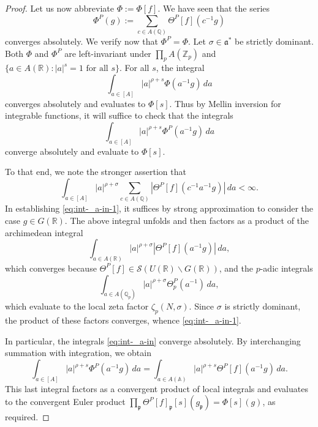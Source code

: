 \begin{proof}
  Let us now abbreviate $\Phi := \Phi[f]$.  We have seen that the series
  \begin{equation*}
    \Phi^P(g) := \sum_{c \in A(\mathbb{Q})} \Theta^P[f](c^{-1} g)
  \end{equation*}
  converges absolutely.  We verify now that $\Phi^P = \Phi$.  Let $\sigma \in \mathfrak{a}^*$ be strictly dominant.  Both $\Phi$ and $\Phi^P$ are left-invariant under $\prod_p A(\mathbb{Z}_p)$ and $\{a \in A(\mathbb{R}) : |a|^s = 1 \text{ for all } s \}$.  For all $s$, the integral
  \begin{equation*}
    \int_{a \in [A]} |a|^{\rho + s} \Phi(a^{-1} g) \, d a
  \end{equation*}
  converges absolutely and evaluates to $\Phi[s]$.  Thus by Mellin inversion for integrable functions, it will suffice to check that the integrals
  \begin{equation}\label{eq:int-_a-in}
    \int_{a \in [A]} |a|^{\rho + s} \Phi^P (a^{-1} g) \, d a
  \end{equation}
  converge absolutely and evaluate to $\Phi[s]$.

  To that end, we note the stronger assertion that
  \begin{equation}\label{eq:int-_a-in-1}
    \int_{a \in [A]} |a|^{\rho + \sigma} \sum_{c \in A(\mathbb{Q})}
    \left\lvert
      \Theta^P[f](c^{-1} a^{-1} g)
    \right\rvert
    \, d a < \infty.
  \end{equation}
  In establishing \eqref{eq:int-_a-in-1}, it suffices by strong approximation to consider the case $g \in G(\mathbb{R})$.  The above integral unfolds and then factors as a product of the archimedean integral
  \begin{equation*}
    \int_{a \in A(\mathbb{R})} |a|^{\rho + \sigma}
    \left\lvert
      \Theta^P[f](a^{-1} g)
    \right\rvert
    \, d a,
  \end{equation*}
  which converges because $\Theta^P[f] \in \mathcal{S}(U(\mathbb{R}) \backslash G(\mathbb{R}))$, and the $p$-adic integrals
  \begin{equation*}
    \int_{a \in A(\mathbb{Q}_p)} |a|^{\rho + \sigma}
    \Theta_p^P(a^{-1})
    \, d a,
  \end{equation*}
  which evaluate to the local zeta factor $\zeta_p(N,\sigma)$.  Since $\sigma$ is strictly dominant, the product of these factors converges, whence \eqref{eq:int-_a-in-1}.

  In particular, the integrals \eqref{eq:int-_a-in} converge absolutely.  By interchanging summation with integration, we obtain
  \begin{equation*}
    \int_{a \in [A]} |a|^{\rho + s}
    \Phi^P (a^{-1} g) \, d a
    =
    \int_{a \in A(\mathbb{A})}
    |a|^{\rho + s}
    \Theta^P[f] (a^{-1} g) \, d a.
  \end{equation*}
  This last integral factors as a convergent product of local integrals and evaluates to the convergent Euler product $\prod_{\mathfrak{p}} \Theta^P[f]_\mathfrak{p}[s](g_\mathfrak{p}) = \Phi[s](g)$, as required.


\end{proof}
